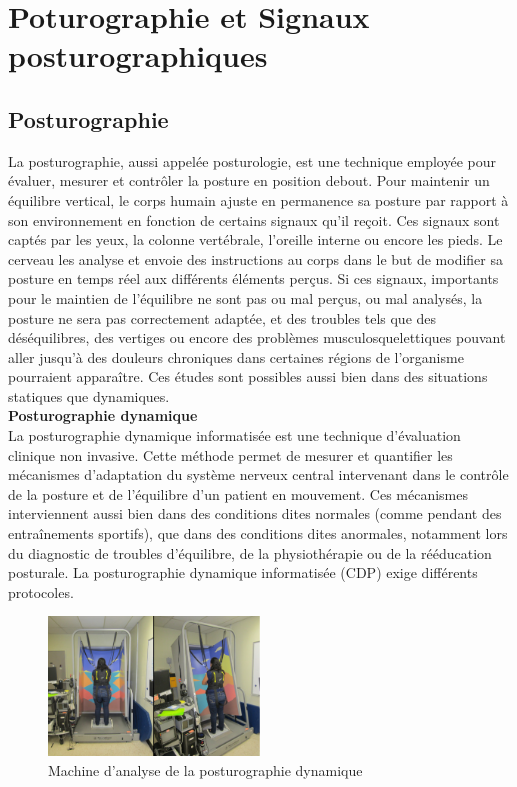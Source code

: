 \section{Poturographie et Signaux posturographiques }

\subsection{Posturographie}

La posturographie, aussi appelée posturologie, est une technique employée pour évaluer, mesurer et contrôler la posture en position debout. Pour maintenir un équilibre vertical, le corps humain ajuste en permanence sa posture par rapport à son environnement en fonction de certains signaux qu'il reçoit. Ces signaux sont captés par les yeux, la colonne vertébrale, l’oreille interne ou encore les pieds. Le cerveau les analyse et envoie des instructions au corps dans le but de modifier sa posture en temps réel aux différents éléments perçus. Si ces signaux, importants pour le maintien de l'équilibre ne sont pas ou mal perçus, ou mal analysés, la posture ne sera pas correctement adaptée, et des troubles tels que des déséquilibres, des vertiges ou encore des problèmes musculosquelettiques pouvant aller jusqu'à des douleurs chroniques dans certaines régions de l’organisme pourraient apparaître.
Ces études sont possibles aussi bien dans des situations statiques que dynamiques.
\\

\textbf{Posturographie dynamique}\\
La posturographie dynamique informatisée est une technique d'évaluation clinique non invasive. Cette méthode permet de mesurer et quantifier les mécanismes d’adaptation du système nerveux central intervenant dans le contrôle de la posture et de l'équilibre d’un patient en mouvement. Ces mécanismes interviennent aussi bien dans des conditions dites normales (comme pendant des entraînements sportifs), que dans des conditions dites anormales, notamment lors du diagnostic de troubles d'équilibre, de la physiothérapie ou de la rééducation posturale. La posturographie dynamique informatisée (CDP) exige différents protocoles.\\


\begin{figure}[H]
  \centering
  \includegraphics[width=0.5\textwidth]{images/introduction/dynamique.png}
  \caption{Machine d’analyse de la posturographie dynamique }
  \label{fig:posturographie-dynamique}
\end{figure}

